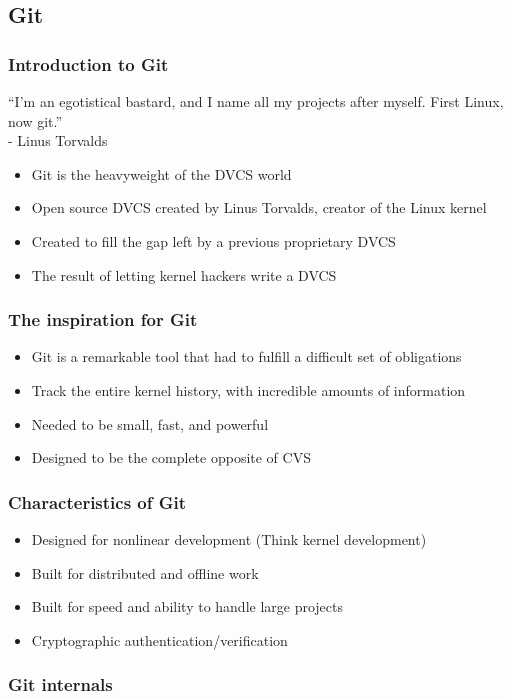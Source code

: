 \documentclass{beamer}
\begin{document}
\subsection{Git}

\begin{frame}
    \frametitle{Introduction to Git}
    ``I'm an egotistical bastard, and I name all my projects after myself. First Linux, now git.'' \\
    - Linus Torvalds
    \begin{itemize}
	\item Git is the heavyweight of the DVCS world
	\item Open source DVCS created by Linus Torvalds, creator of the Linux kernel
	\item Created to fill the gap left by a previous proprietary DVCS
	\item The result of letting kernel hackers write a DVCS
    \end{itemize}
\end{frame}

\begin{frame}
    \frametitle{The inspiration for Git}
    \begin{itemize}
	\item Git is a remarkable tool that had to fulfill a difficult set of obligations
	\item Track the entire kernel history, with incredible amounts of information
	\item Needed to be small, fast, and powerful
	\item Designed to be the complete opposite of CVS
    \end{itemize}
\end{frame}

\begin{frame}
    \frametitle{Characteristics of Git}
    \begin{itemize}
	\item Designed for nonlinear development (Think kernel development)
	\item Built for distributed and offline work
	\item Built for speed and ability to handle large projects
	\item Cryptographic authentication/verification
    \end{itemize}
\end{frame}

\subsubsection{Git internals}
\end{document}
